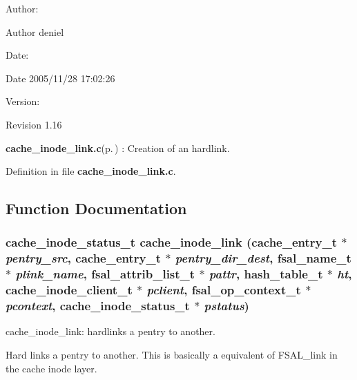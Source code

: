 \begin{Desc}
\item[Author:]\begin{Desc}
\item[Author]deniel \end{Desc}
\end{Desc}
\begin{Desc}
\item[Date:]\begin{Desc}
\item[Date]2005/11/28 17:02:26 \end{Desc}
\end{Desc}
\begin{Desc}
\item[Version:]\begin{Desc}
\item[Revision]1.16 \end{Desc}
\end{Desc}
{\bf cache\_\-inode\_\-link.c}{\rm (p.\,\pageref{cache__inode__link_8c})} : Creation of an hardlink.

Definition in file {\bf cache\_\-inode\_\-link.c}.

\subsection{Function Documentation}
\subsubsection{\setlength{\rightskip}{0pt plus 5cm}cache\_\-inode\_\-status\_\-t cache\_\-inode\_\-link (cache\_\-entry\_\-t $\ast$ {\em pentry\_\-src}, cache\_\-entry\_\-t $\ast$ {\em pentry\_\-dir\_\-dest}, fsal\_\-name\_\-t $\ast$ {\em plink\_\-name}, fsal\_\-attrib\_\-list\_\-t $\ast$ {\em pattr}, hash\_\-table\_\-t $\ast$ {\em ht}, cache\_\-inode\_\-client\_\-t $\ast$ {\em pclient}, fsal\_\-op\_\-context\_\-t $\ast$ {\em pcontext}, cache\_\-inode\_\-status\_\-t $\ast$ {\em pstatus})}\label{cache__inode__link_8c_a0}


cache\_\-inode\_\-link: hardlinks a pentry to another.

Hard links a pentry to another. This is basically a equivalent of FSAL\_\-link in the cache inode layer.

